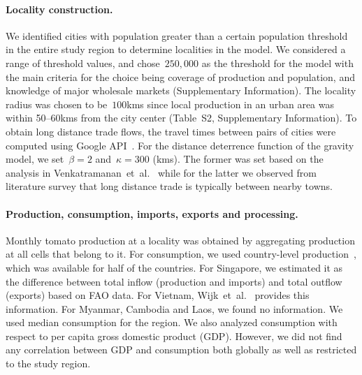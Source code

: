 \documentclass[11pt]{article}
\theoremstyle{definition}
\begin{document}
\paragraph{Locality construction.}
We identified cities with population greater than a certain population
threshold in the entire study region to determine localities in the model.
We considered a range of threshold values, and chose~$250,000$ as the
threshold for the model with the main criteria for the choice being
coverage of production and population, and knowledge of major wholesale
markets (Supplementary Information). The locality radius was chosen to
be~$100$kms since local production in an urban area was within 50--60kms
from the city center (Table~S2, Supplementary Information). To obtain long
distance trade flows, the travel times between pairs of cities were
computed using Google API~\cite{googleapi}. For the distance deterrence
function of the gravity model, we set~$\beta=2$ and~$\kappa=300$ (kms). The
former was set based on the analysis in
Venkatramanan~et~al.~\cite{venkatramanan2017towards} while for the latter
we observed from literature survey that long distance trade is typically between
nearby towns.

\paragraph{Production, consumption, imports, exports and processing.}
Monthly tomato production at a locality was obtained by aggregating
production at all cells that belong to it. For consumption, we used
country-level production~\cite{consumption}, which was available for half
of the countries. For Singapore, we estimated it as the difference between
total inflow (production and imports) and total outflow (exports) based on
FAO data. For Vietnam, Wijk~et~al.~\cite{wijk2007} provides this
information. For Myanmar, Cambodia and Laos, we found no information. We
used median consumption for the region. We also analyzed consumption with
respect to per capita gross domestic product (GDP). However, we did not
find any correlation between GDP and consumption both globally as well as
restricted to the study region. 
\end{document}
